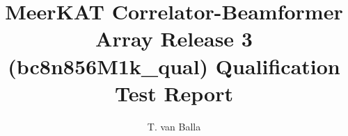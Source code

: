 \documentclass[11pt,english,twoside]{article}
\author{T. van Balla}
\begin{document}
\title{MeerKAT Correlator-Beamformer Array Release 3  (bc8n856M1k_qual) Qualification Test Report}
\makekatdocbeginning
\end{document}
